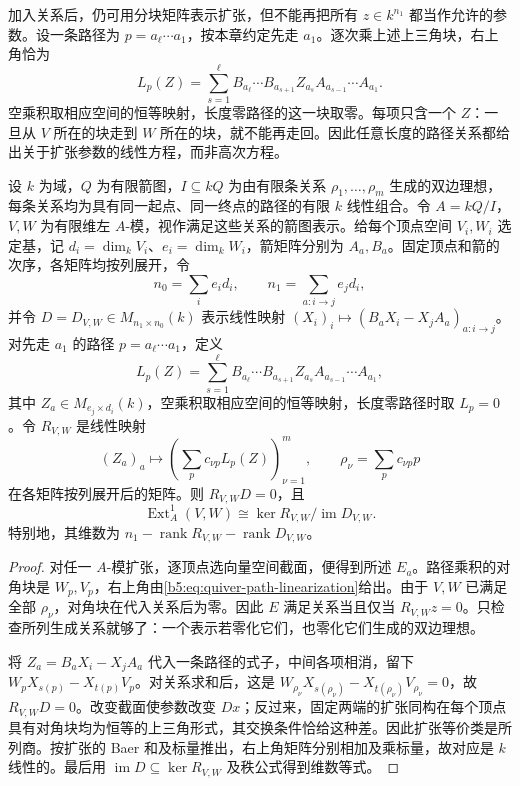 \ProseParagraphBreak
加入关系后，仍可用分块矩阵表示扩张，但不能再把所有 \(z\in k^{n_1}\) 都当作允许的参数。设一条路径为 \(p=a_\ell\cdots a_1\)，按本章约定先走 \(a_1\)。逐次乘上述上三角块，右上角恰为
\begin{equation}\label{b5:eq:quiver-path-linearization}
	L_p(Z)=\sum_{s=1}^{\ell}
	B_{a_\ell}\cdots B_{a_{s+1}}Z_{a_s}A_{a_{s-1}}\cdots A_{a_1}.
\end{equation}
空乘积取相应空间的恒等映射，长度零路径的这一块取零。每项只含一个 \(Z\)：一旦从 \(V\) 所在的块走到 \(W\) 所在的块，就不能再走回。因此任意长度的路径关系都给出关于扩张参数的线性方程，而非高次方程。

\begin{proposition}\label{b5:prop:quiver-ext-relations-matrix}
	设 \(k\) 为域，\(Q\) 为有限箭图，\(I\subseteq kQ\) 为由有限条关系 \(\rho_1,\ldots,\rho_m\) 生成的双边理想，每条关系均为具有同一起点、同一终点的路径的有限 \(k\) 线性组合。令 \(A=kQ/I\)，\(V,W\) 为有限维左 \(A\)-模，视作满足这些关系的箭图表示。给每个顶点空间 \(V_i,W_i\) 选定基，记 \(d_i=\dim_kV_i\)、\(e_i=\dim_kW_i\)，箭矩阵分别为 \(A_a,B_a\)。固定顶点和箭的次序，各矩阵均按列展开，令
	\[
		n_0=\sum_i e_id_i,\qquad n_1=\sum_{a:i\to j}e_jd_i,
	\]
	并令 \(D=D_{V,W}\in M_{n_1\times n_0}(k)\) 表示线性映射 \((X_i)_i\mapsto(B_aX_i-X_jA_a)_{a:i\to j}\)。对先走 \(a_1\) 的路径 \(p=a_\ell\cdots a_1\)，定义
	\[
		L_p(Z)=\sum_{s=1}^{\ell}
		B_{a_\ell}\cdots B_{a_{s+1}}Z_{a_s}A_{a_{s-1}}\cdots A_{a_1},
	\]
	其中 \(Z_a\in M_{e_j\times d_i}(k)\)，空乘积取相应空间的恒等映射，长度零路径时取 \(L_p=0\)。令 \(R_{V,W}\) 是线性映射
	\[
		(Z_a)_a\longmapsto\left(\sum_p c_{\nu p}L_p(Z)\right)_{\nu=1}^m,
		\qquad \rho_\nu=\sum_p c_{\nu p}p
	\]
	在各矩阵按列展开后的矩阵。则 \(R_{V,W}D=0\)，且
	\begin{equation}\label{b5:eq:quiver-ext-relations-kernel}
		\operatorname{Ext}_A^1(V,W)
		\cong\ker R_{V,W}/\operatorname{im}D_{V,W}.
	\end{equation}
	特别地，其维数为 \(n_1-\operatorname{rank}R_{V,W}-\operatorname{rank}D_{V,W}\)。
\end{proposition}
\begin{proof}
	对任一 \(A\)-模扩张，逐顶点选向量空间截面，便得到所述 \(E_a\)。路径乘积的对角块是 \(W_p,V_p\)，右上角由\eqref{b5:eq:quiver-path-linearization}给出。由于 \(V,W\) 已满足全部 \(\rho_\nu\)，对角块在代入关系后为零。因此 \(E\) 满足关系当且仅当 \(R_{V,W}z=0\)。只检查所列生成关系就够了：一个表示若零化它们，也零化它们生成的双边理想。

	将 \(Z_a=B_aX_i-X_jA_a\) 代入一条路径的式子，中间各项相消，留下 \(W_pX_{s(p)}-X_{t(p)}V_p\)。对关系求和后，这是 \(W_{\rho_\nu}X_{s(\rho_\nu)}-X_{t(\rho_\nu)}V_{\rho_\nu}=0\)，故 \(R_{V,W}D=0\)。改变截面使参数改变 \(Dx\)；反过来，固定两端的扩张同构在每个顶点具有对角块均为恒等的上三角形式，其交换条件恰给这种差。因此扩张等价类是所列商。按扩张的 Baer 和及标量推出，右上角矩阵分别相加及乘标量，故对应是 \(k\) 线性的。最后用 \(\operatorname{im}D\subseteq\ker R_{V,W}\) 及秩公式得到维数等式。
\end{proof}

